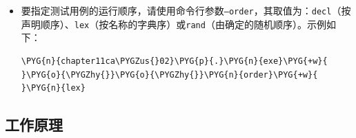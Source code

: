 \begin{itemize}
\begin{codeblockbg}
\begin{Verbatim}[commandchars=\\\{\},breaklines=true,breakanywhere=true,fontsize=\codefont,xleftmargin=17bp]
\PYG{n}{chapter11ca\PYGZus{}02}\PYG{p}{.}\PYG{n}{exe}\PYG{+w}{ }\PYG{l+s}{\PYGZdq{}}\PYG{l+s}{test construction}\PYG{l+s}{\PYGZdq{}}\PYG{+w}{ }\PYG{o}{\PYGZhy{}}\PYG{o}{\PYGZhy{}}\PYG{n}{section}\PYG{+w}{ }\PYG{l+s}{\PYGZdq{}}\PYG{l+s}{test origin}\PYG{l+s}{\PYGZdq{}}
\PYG{o}{=}\PYG{o}{=}\PYG{o}{=}\PYG{o}{=}\PYG{o}{=}\PYG{o}{=}\PYG{o}{=}\PYG{o}{=}\PYG{o}{=}\PYG{o}{=}\PYG{o}{=}\PYG{o}{=}\PYG{o}{=}\PYG{o}{=}\PYG{o}{=}\PYG{o}{=}\PYG{o}{=}\PYG{o}{=}\PYG{o}{=}\PYG{o}{=}\PYG{o}{=}\PYG{o}{=}\PYG{o}{=}\PYG{o}{=}\PYG{o}{=}\PYG{o}{=}\PYG{o}{=}\PYG{o}{=}\PYG{o}{=}\PYG{o}{=}\PYG{o}{=}\PYG{o}{=}\PYG{o}{=}\PYG{o}{=}\PYG{o}{=}\PYG{o}{=}\PYG{o}{=}\PYG{o}{=}\PYG{o}{=}\PYG{o}{=}\PYG{o}{=}\PYG{o}{=}\PYG{o}{=}\PYG{o}{=}\PYG{o}{=}\PYG{o}{=}\PYG{o}{=}\PYG{o}{=}\PYG{o}{=}\PYG{o}{=}
\PYG{n}{All}\PYG{+w}{ }\PYG{n}{tests}\PYG{+w}{ }\PYG{n}{passed}\PYG{+w}{ }\PYG{p}{(}\PYG{l+m+mi}{3}\PYG{+w}{ }\PYG{n}{assertions}\PYG{+w}{ }\PYG{n}{in}\PYG{+w}{ }\PYG{l+m+mi}{1}\PYG{+w}{ }\PYG{n}{test}\PYG{+w}{ }\PYG{k}{case}\PYG{p}{)}
\end{Verbatim}
\end{codeblockbg}



\item 要指定测试用例的运行顺序，请使用命令行参数\texttt{--\allowbreak{}order}，其取值为：\texttt{decl}（按声明顺序）、\texttt{lex}（按名称的字典序）或\texttt{rand}（由确定的随机顺序）。示例如下：



\begin{codeblockbg}
\begin{Verbatim}[commandchars=\\\{\},breaklines=true,breakanywhere=true,fontsize=\codefont,xleftmargin=17bp]
\PYG{n}{chapter11ca\PYGZus{}02}\PYG{p}{.}\PYG{n}{exe}\PYG{+w}{ }\PYG{o}{\PYGZhy{}}\PYG{o}{\PYGZhy{}}\PYG{n}{order}\PYG{+w}{ }\PYG{n}{lex}
\end{Verbatim}
\end{codeblockbg}

\end{itemize}



\subsection{工作原理}


